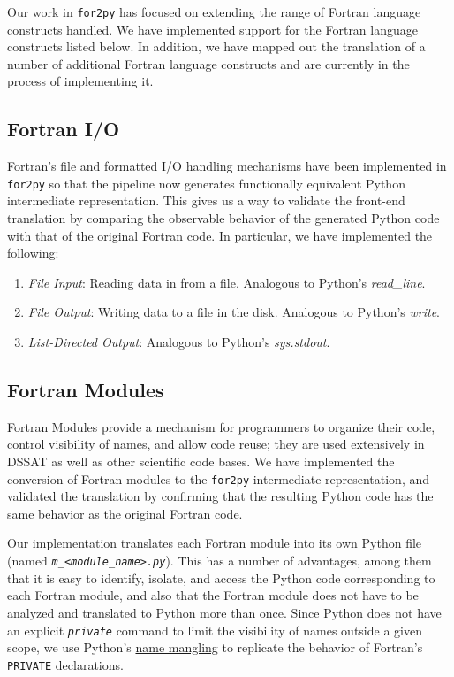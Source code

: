 \documentclass[article, 12pt, oneside]{memoir}
\begin{document}
Our work in \texttt{for2py} has focused on extending the range of
Fortran language constructs handled. We have implemented support for the
Fortran language constructs listed below. In addition, we have mapped
out the translation of a number of additional Fortran language
constructs and are currently in the process of implementing it.

\hypertarget{fortran-io}{%
\subsection{Fortran I/O}\label{fortran-io}}

Fortran's file and formatted I/O handling mechanisms have been
implemented in \texttt{for2py} so that the pipeline now generates
functionally equivalent Python intermediate representation. This gives
us a way to validate the front-end translation by comparing the
observable behavior of the generated Python code with that of the
original Fortran code. In particular, we have implemented the following:

\begin{enumerate}
\def\labelenumi{\arabic{enumi}.}
\tightlist
\item
  \emph{File Input}: Reading data in from a file. Analogous to Python's
  \emph{read\_line}.
\item
  \emph{File Output}: Writing data to a file in the disk. Analogous to
  Python's \emph{write}.
\item
  \emph{List-Directed Output}: Analogous to Python's \emph{sys.stdout}.
\end{enumerate}

\hypertarget{fortran-modules}{%
\subsection{Fortran Modules}\label{fortran-modules}}

Fortran Modules provide a mechanism for programmers to organize their
code, control visibility of names, and allow code reuse; they are used
extensively in DSSAT as well as other scientific code bases. We have
implemented the conversion of Fortran modules to the \texttt{for2py}
intermediate representation, and validated the translation by confirming
that the resulting Python code has the same behavior as the original
Fortran code.

Our implementation translates each Fortran module into its own Python
file (named 
\emph{\texttt{m\_\textless{}module\_name\textgreater{}.py}}). This has a
number of advantages, among them that it is easy to identify, isolate,
and access the Python code corresponding to each Fortran module, and
also that the Fortran module does not have to be analyzed and translated
to Python more than once. Since Python does not have an explicit
\emph{\texttt{private}} command to limit the visibility of names outside
a given scope, we use Python's
\href{https://docs.python.org/2/tutorial/classes.html\#private-variables-and-class-local-references}{name
mangling} to replicate the behavior of Fortran's \texttt{PRIVATE}
declarations.
\end{document}
